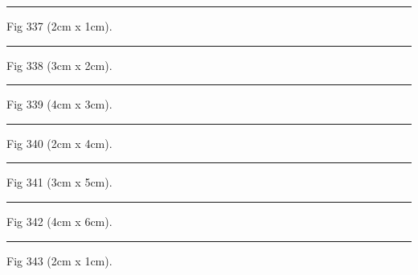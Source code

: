 \documentclass[a4paper,11pt]{article}
\begin{document}
\begin{swarmwrap}%
  \begin{minipage}[t]{2cm}
    \centering
    \rule{\linewidth}{1cm}
    {\footnotesize Fig 337 (2cm x 1cm).}
  \end{minipage}%
\end{swarmwrap}%
\swarmwrapnext
\lipsum[37]%

\begin{swarmwrap}%
  \begin{minipage}[t]{3cm}
    \centering
    \rule{\linewidth}{2cm}
    {\footnotesize Fig 338 (3cm x 2cm).}
  \end{minipage}%
\end{swarmwrap}%
\swarmwrapnext
\lipsum[38]%

\begin{swarmwrap}%
  \begin{minipage}[t]{4cm}
    \centering
    \rule{\linewidth}{3cm}
    {\footnotesize Fig 339 (4cm x 3cm).}
  \end{minipage}%
\end{swarmwrap}%
\swarmwrapnext
\lipsum[39]%

\begin{swarmwrap}%
  \begin{minipage}[t]{2cm}
    \centering
    \rule{\linewidth}{4cm}
    {\footnotesize Fig 340 (2cm x 4cm).}
  \end{minipage}%
\end{swarmwrap}%
\swarmwrapnext
\lipsum[40]%

\begin{swarmwrap}%
  \begin{minipage}[t]{3cm}
    \centering
    \rule{\linewidth}{5cm}
    {\footnotesize Fig 341 (3cm x 5cm).}
  \end{minipage}%
\end{swarmwrap}%
\swarmwrapnext
\lipsum[41]%

\begin{swarmwrap}%
  \begin{minipage}[t]{4cm}
    \centering
    \rule{\linewidth}{6cm}
    {\footnotesize Fig 342 (4cm x 6cm).}
  \end{minipage}%
\end{swarmwrap}%
\swarmwrapnext
\lipsum[42]%

\begin{swarmwrap}%
  \begin{minipage}[t]{2cm}
    \centering
    \rule{\linewidth}{1cm}
    {\footnotesize Fig 343 (2cm x 1cm).}
  \end{minipage}%
\end{swarmwrap}%
\swarmwrapnext
\lipsum[43]%
\end{document}
